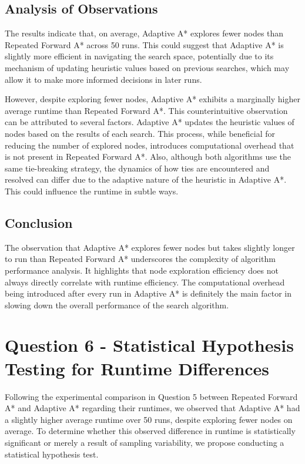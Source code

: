\documentclass{article}
\begin{document}
\subsection{Analysis of Observations}

The results indicate that, on average, Adaptive A* explores fewer nodes than Repeated Forward A* across 50 runs. This could suggest that Adaptive A* is slightly more efficient in navigating the search space, potentially due to its mechanism of updating heuristic values based on previous searches, which may allow it to make more informed decisions in later runs.

However, despite exploring fewer nodes, Adaptive A* exhibits a marginally higher average runtime than Repeated Forward A*. This counterintuitive observation can be attributed to several factors. Adaptive A* updates the heuristic values of nodes based on the results of each search. This process, while beneficial for reducing the number of explored nodes, introduces computational overhead that is not present in Repeated Forward A*. Also, although both algorithms use the same tie-breaking strategy, the dynamics of how ties are encountered and resolved can differ due to the adaptive nature of the heuristic in Adaptive A*. This could influence the runtime in subtle ways.

\subsection{Conclusion}

The observation that Adaptive A* explores fewer nodes but takes slightly longer to run than Repeated Forward A* underscores the complexity of algorithm performance analysis. It highlights that node exploration efficiency does not always directly correlate with runtime efficiency. The computational overhead being introduced after every run in Adaptive A* is definitely the main factor in slowing down the overall performance of the search algorithm.


\section{Question 6 - Statistical Hypothesis Testing for Runtime Differences}

Following the experimental comparison in Question 5 between Repeated Forward A* and Adaptive A* regarding their runtimes, we observed that Adaptive A* had a slightly higher average runtime over 50 runs, despite exploring fewer nodes on average. To determine whether this observed difference in runtime is statistically significant or merely a result of sampling variability, we propose conducting a statistical hypothesis test.
\end{document}
